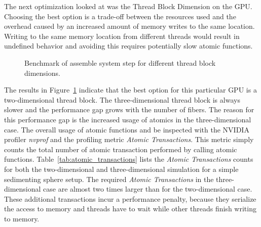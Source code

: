 \documentclass[a4paper,11pt]{kth-mag}
\begin{document}
The next optimization looked at was the Thread Block Dimension on the GPU. Choosing the best option is a trade-off between the resources used and the overhead caused by an increased amount of memory writes to the same location. Writing to the same memory location from different threads would result in undefined behavior and avoiding this requires potentially slow atomic functions.

\begin{figure}[!htbp]
  \centering
  \caption{Benchmark of assemble system step for different thread block dimensions.}
  \label{fig:bench_cuda_thread_blocks}
\end{figure}

The results in Figure~\ref{fig:bench_cuda_thread_blocks} indicate that the best option for this particular GPU is a two-dimensional thread block. The three-dimensional thread block is always slower and the performance gap grows with the number of fibers. The reason for this performance gap is the increased usage of atomics in the three-dimensional case. The overall usage of atomic functions and be inspected with the NVIDIA profiler \emph{nvprof} and the profiling metric \emph{Atomic Transactions}. This metric simply counts the total number of atomic transaction performed by calling atomic functions. Table~\ref{tab:atomic_transactions} lists the \emph{Atomic Transactions} counts for both the two-dimensional and three-dimensional simulation for a simple sedimenting sphere setup. The required \emph{Atomic Transactions} in the three-dimensional case are almost two times larger than for the two-dimensional case. These additional transactions incur a performance penalty, because they serialize the access to memory and threads have to wait while other threads finish writing to memory.
\end{document}
